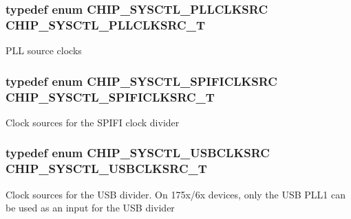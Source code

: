 \subsubsection[{\texorpdfstring{C\+H\+I\+P\+\_\+\+S\+Y\+S\+C\+T\+L\+\_\+\+P\+L\+L\+C\+L\+K\+S\+R\+C\+\_\+T}{CHIP_SYSCTL_PLLCLKSRC_T}}]{\setlength{\rightskip}{0pt plus 5cm}typedef enum {\bf C\+H\+I\+P\+\_\+\+S\+Y\+S\+C\+T\+L\+\_\+\+P\+L\+L\+C\+L\+K\+S\+RC}  {\bf C\+H\+I\+P\+\_\+\+S\+Y\+S\+C\+T\+L\+\_\+\+P\+L\+L\+C\+L\+K\+S\+R\+C\+\_\+T}}\hypertarget{group__CLOCK__17XX__40XX_gacda7fd6d13922330ce9344dbc4ec85b7}{}\label{group__CLOCK__17XX__40XX_gacda7fd6d13922330ce9344dbc4ec85b7}
P\+LL source clocks 
\subsubsection[{\texorpdfstring{C\+H\+I\+P\+\_\+\+S\+Y\+S\+C\+T\+L\+\_\+\+S\+P\+I\+F\+I\+C\+L\+K\+S\+R\+C\+\_\+T}{CHIP_SYSCTL_SPIFICLKSRC_T}}]{\setlength{\rightskip}{0pt plus 5cm}typedef enum {\bf C\+H\+I\+P\+\_\+\+S\+Y\+S\+C\+T\+L\+\_\+\+S\+P\+I\+F\+I\+C\+L\+K\+S\+RC}  {\bf C\+H\+I\+P\+\_\+\+S\+Y\+S\+C\+T\+L\+\_\+\+S\+P\+I\+F\+I\+C\+L\+K\+S\+R\+C\+\_\+T}}\hypertarget{group__CLOCK__17XX__40XX_ga55d8797a3b68191ced784240378f74ac}{}\label{group__CLOCK__17XX__40XX_ga55d8797a3b68191ced784240378f74ac}
Clock sources for the S\+P\+I\+FI clock divider 
\subsubsection[{\texorpdfstring{C\+H\+I\+P\+\_\+\+S\+Y\+S\+C\+T\+L\+\_\+\+U\+S\+B\+C\+L\+K\+S\+R\+C\+\_\+T}{CHIP_SYSCTL_USBCLKSRC_T}}]{\setlength{\rightskip}{0pt plus 5cm}typedef enum {\bf C\+H\+I\+P\+\_\+\+S\+Y\+S\+C\+T\+L\+\_\+\+U\+S\+B\+C\+L\+K\+S\+RC}  {\bf C\+H\+I\+P\+\_\+\+S\+Y\+S\+C\+T\+L\+\_\+\+U\+S\+B\+C\+L\+K\+S\+R\+C\+\_\+T}}\hypertarget{group__CLOCK__17XX__40XX_ga0ba14bd48363645f607b49fbcc8624df}{}\label{group__CLOCK__17XX__40XX_ga0ba14bd48363645f607b49fbcc8624df}
Clock sources for the U\+SB divider. On 175x/6x devices, only the U\+SB P\+L\+L1 can be used as an input for the U\+SB divider 

